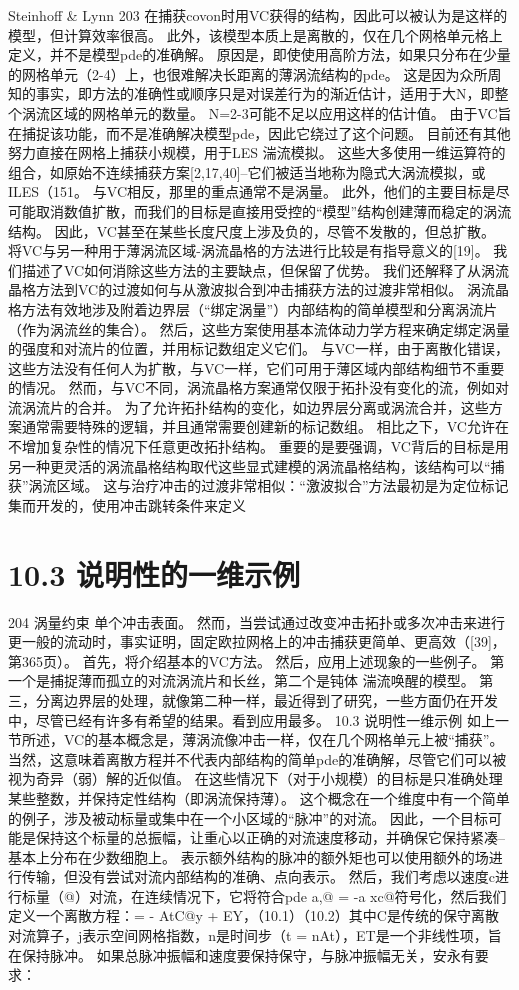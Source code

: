 \documentclass[UTF8,11pt,a4paper,openany,fontset=fandol]{ctexbook}
\begin{document}
Steinhoff \& Lynn 203 在捕获covon时用VC获得的结构，因此可以被认为是这样的模型，但计算效率很高。 此外，该模型本质上是离散的，仅在几个网格单元格上定义，并不是模型pde的准确解。 原因是，即使使用高阶方法，如果只分布在少量的网格单元（2-4）上，也很难解决长距离的薄涡流结构的pde。 这是因为众所周知的事实，即方法的准确性或顺序只是对误差行为的渐近估计，适用于大N，即整个涡流区域的网格单元的数量。 N=2-3可能不足以应用这样的估计值。 由于VC旨在捕捉该功能，而不是准确解决模型pde，因此它绕过了这个问题。 目前还有其他努力直接在网格上捕获小规模，用于LES 湍流模拟。 这些大多使用一维运算符的组合，如原始不连续捕获方案[2,17,40]--它们被适当地称为隐式大涡流模拟，或ILES（151。 与VC相反，那里的重点通常不是涡量。 此外，他们的主要目标是尽可能取消数值扩散，而我们的目标是直接用受控的“模型”结构创建薄而稳定的涡流结构。 因此，VC甚至在某些长度尺度上涉及负的，尽管不发散的，但总扩散。 将VC与另一种用于薄涡流区域-涡流晶格的方法进行比较是有指导意义的[19]。 我们描述了VC如何消除这些方法的主要缺点，但保留了优势。 我们还解释了从涡流晶格方法到VC的过渡如何与从激波拟合到冲击捕获方法的过渡非常相似。 涡流晶格方法有效地涉及附着边界层（“绑定涡量”）内部结构的简单模型和分离涡流片（作为涡流丝的集合）。 然后，这些方案使用基本流体动力学方程来确定绑定涡量的强度和对流片的位置，并用标记数组定义它们。 与VC一样，由于离散化错误，这些方法没有任何人为扩散，与VC一样，它们可用于薄区域内部结构细节不重要的情况。 然而，与VC不同，涡流晶格方案通常仅限于拓扑没有变化的流，例如对流涡流片的合并。 为了允许拓扑结构的变化，如边界层分离或涡流合并，这些方案通常需要特殊的逻辑，并且通常需要创建新的标记数组。 相比之下，VC允许在不增加复杂性的情况下任意更改拓扑结构。 重要的是要强调，VC背后的目标是用另一种更灵活的涡流晶格结构取代这些显式建模的涡流晶格结构，该结构可以“捕获”涡流区域。 这与治疗冲击的过渡非常相似：“激波拟合”方法最初是为定位标记集而开发的，使用冲击跳转条件来定义

\section{10.3 说明性的一维示例}
204 涡量约束 单个冲击表面。 然而，当尝试通过改变冲击拓扑或多次冲击来进行更一般的流动时，事实证明，固定欧拉网格上的冲击捕获更简单、更高效（[39]，第365页）。 首先，将介绍基本的VC方法。 然后，应用上述现象的一些例子。 第一个是捕捉薄而孤立的对流涡流片和长丝，第二个是钝体 湍流唤醒的模型。 第三，分离边界层的处理，就像第二种一样，最近得到了研究，一些方面仍在开发中，尽管已经有许多有希望的结果。看到应用最多。 10.3 说明性一维示例 如上一节所述，VC的基本概念是，薄涡流像冲击一样，仅在几个网格单元上被“捕获”。 当然，这意味着离散方程并不代表内部结构的简单pde的准确解，尽管它们可以被视为奇异（弱）解的近似值。 在这些情况下（对于小规模）的目标是只准确处理某些整数，并保持定性结构（即涡流保持薄）。 这个概念在一个维度中有一个简单的例子，涉及被动标量或集中在一个小区域的“脉冲”的对流。 因此，一个目标可能是保持这个标量的总振幅，让重心以正确的对流速度移动，并确保它保持紧凑--基本上分布在少数细胞上。 表示额外结构的脉冲的额外矩也可以使用额外的场进行传输，但没有尝试对流内部结构的准确、点向表示。 然后，我们考虑以速度c进行标量（@）对流，在连续情况下，它将符合pde a,@ = -a xc@符号化，然后我们定义一个离散方程：= - AtC@y + EY，（10.1）（10.2）其中C是传统的保守离散对流算子，j表示空间网格指数，n是时间步（t = nAt），ET是一个非线性项，旨在保持脉冲。 如果总脉冲振幅和速度要保持保守，与脉冲振幅无关，安永有要求：
\end{document}
